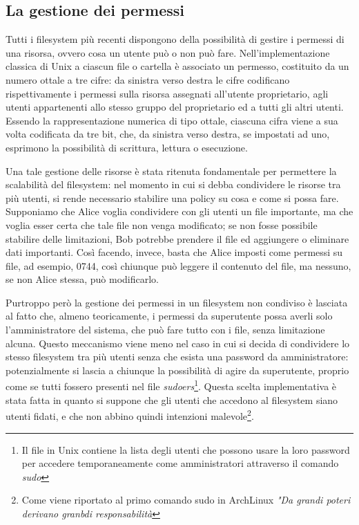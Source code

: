  \subsection{La gestione dei permessi}
 Tutti i filesystem più recenti dispongono della possibilità di gestire i permessi di una risorsa, ovvero cosa un utente può o non può fare. Nell'implementazione classica di Unix a ciascun file o cartella è associato un permesso, costituito da un numero ottale a tre cifre: da sinistra verso destra le cifre codificano rispettivamente i permessi sulla risorsa assegnati all'utente proprietario, agli utenti appartenenti allo stesso gruppo del proprietario ed a tutti gli altri utenti. Essendo la rappresentazione numerica di tipo ottale, ciascuna cifra viene a sua volta codificata da tre bit, che, da sinistra verso destra, se impostati ad uno, esprimono la possibilità di scrittura, lettura o esecuzione.
 
 Una tale gestione delle risorse è stata ritenuta fondamentale per permettere la scalabilità del filesystem: nel momento in cui si debba condividere le risorse tra più utenti, si rende necessario stabilire una policy su cosa e come si possa fare. Supponiamo che Alice voglia condividere con gli utenti un file importante, ma che voglia esser certa che tale file non venga modificato; se non fosse possibile stabilire delle limitazioni, Bob potrebbe prendere il file ed aggiungere o eliminare dati importanti. Così facendo, invece, basta che Alice imposti come permessi su file, ad esempio, 0744, così chiunque può leggere il contenuto del file, ma nessuno, se non Alice stessa, può modificarlo.
 
 Purtroppo però la gestione dei permessi in un filesystem non condiviso è lasciata al fatto che, almeno teoricamente, i permessi da superutente possa averli solo l'amministratore del sistema, che può fare tutto con i file, senza limitazione alcuna. Questo meccanismo viene meno nel caso in cui si decida di condividere lo stesso filesystem tra più utenti senza che esista una password da amministratore: potenzialmente si lascia a chiunque la possibilità di agire da superutente, proprio come se tutti fossero presenti nel file \emph{sudoers}\footnote{Il file in Unix contiene la lista degli utenti che possono usare la loro password per accedere temporaneamente come amministratori attraverso il comando \emph{sudo}}. Questa scelta implementativa è stata fatta in quanto si suppone che gli utenti che accedono al filesystem siano utenti fidati, e che non abbino quindi intenzioni malevole\footnote{Come viene riportato al primo comando sudo in ArchLinux \emph{"Da grandi poteri derivano granbdi responsabilità}}.
 
